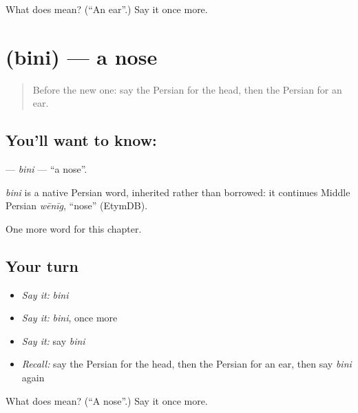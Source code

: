 \begin{tcolorbox}[breakable,colback=teal!4,colframe=teal!35!black,title={Before you move on}]
What does  mean? (\textquotedblleft{}An ear\textquotedblright{}.) Say it once more.
\end{tcolorbox}
\section[\texorpdfstring{\fa{بینی} (bini)}{بینی (bini)}]{ (bini) — a nose}

\label{lesson:FA-C27-bini}



\begin{quote}
Before the new one: say the Persian for the head, then the Persian for an ear.
\end{quote}

\subsection*{You'll want to know: }
\textbf{} — \emph{bini} — \textquotedblleft{}a nose\textquotedblright{}.

\begin{cousinweb}
\emph{bini} is a native Persian word, inherited rather than borrowed: it continues Middle Persian \emph{wēnīg}, \textquotedblleft{}nose\textquotedblright{} (EtymDB).
\end{cousinweb}

\begin{grammarlens}[title={What you've built}]
One more word for this chapter.
\end{grammarlens}

\subsection*{Your turn}
\begin{itemize}
\raggedright
  \item \emph{Say it:} \emph{bini}
  \item \emph{Say it:} \emph{bini}, once more
  \item \emph{Say it:} say \emph{bini}
  \item \emph{Recall:} say the Persian for the head, then the Persian for an ear, then say \emph{bini} again
\end{itemize}

\begin{tcolorbox}[breakable,colback=teal!4,colframe=teal!35!black,title={Before you move on}]
What does  mean? (\textquotedblleft{}A nose\textquotedblright{}.) Say it once more.
\end{tcolorbox}
